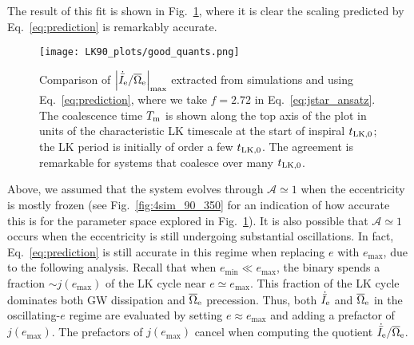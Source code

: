 \documentclass[
        twocolumn,
        twocolappendix
    ]{aastex63}
\newcommand*{\abs}[1]{\left|#1\right|}
\begin{document}
The result of this fit is shown in Fig.~\ref{fig:good_quants}, where it is clear
the scaling predicted by Eq.~\eqref{eq:prediction} is remarkably accurate.
\begin{figure}
    \centering
    \texttt{[image: LK90\_plots/good\_quants.png]}
    \caption{Comparison of $\abs{\dot{\bar{I}}_{\rm e} / \overline{\Omega}_{\rm
    e}}_{\max}$ extracted from simulations and using Eq.~\eqref{eq:prediction},
    where we take $f = 2.72$ in Eq.~\eqref{eq:jstar_ansatz}. The coalescence time
    $T_{\rm m}$ is shown along the top axis of the plot in units of the
    characteristic LK timescale at the start of inspiral $t_{\rm LK, 0}$; the LK
    period is initially of order a few $t_{\rm LK, 0}$. The agreement is
    remarkable for systems that coalesce over many $t_{\rm LK, 0}$.
    }\label{fig:good_quants}
\end{figure}

Above, we assumed that the system evolves through $\mathcal{A} \simeq 1$  when
the eccentricity is mostly frozen (see Fig.~\ref{fig:4sim_90_350} for an
indication of how accurate this is for the parameter space explored in
Fig.~\ref{fig:good_quants}). It is also possible that $\mathcal{A} \simeq 1$
occurs when the eccentricity is still undergoing substantial oscillations. In
fact, Eq.~\eqref{eq:prediction} is still accurate in this regime when replacing
$e$ with $e_{\max}$, due to the following analysis. Recall that when $e_{\min}
\ll e_{\max}$, the binary spends a fraction $\sim j(e_{\max})$ of the LK cycle
near $e \simeq e_{\max}$. This fraction of the LK cycle dominates both GW
dissipation and $\overline{\Omega}_{\rm e}$ precession. Thus, both
$\dot{\bar{I}}_{\rm e}$ and $\overline{\Omega}_{\rm e}$ in the oscillating-$e$
regime are evaluated by setting $e \approx e_{\max}$ and adding a prefactor of
$j(e_{\max})$. The prefactors of $j(e_{\max})$ cancel when computing the
quotient $\dot{\bar{I}}_{\rm e} / \overline{\Omega}_{\rm e}$.
\end{document}
